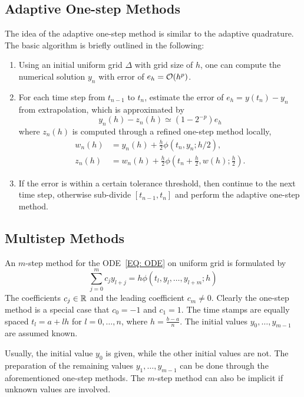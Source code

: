 \subsection{Adaptive One-step Methods}
The idea of the adaptive one-step method is similar to the adaptive quadrature. The basic algorithm is briefly outlined in the following:
\begin{enumerate}
    \item Using an initial uniform grid $\Delta$ with grid size of $h$, one can compute the numerical solution $y_n$ with error of $e_h = \mathcal O(h^p)$.
    \item For each time step from $t_{n-1}$ to $t_n$, estimate the error of $e_h = y(t_n) - y_n$ from extrapolation, which is approximated by 
    $$y_n(h) - z_n(h)\simeq (1 - 2^{-p})e_h$$
    where $z_n(h)$ is computed through a refined one-step method locally,
    \begin{equation}
        \begin{aligned}
            w_n(h) &= y_n(h) + \frac{h}{2} \phi(t_n, y_n; h/2), \\ 
            z_n(h)&=w_n(h) + \frac{h}{2}\phi(t_n+\frac{h}{2}, w(h); \frac{h}{2}).
        \end{aligned}
    \end{equation}
    \item If the error is within a certain tolerance threshold, then continue to the next time step, otherwise sub-divide $[t_{n-1}, t_n]$ and perform the adaptive one-step method.
\end{enumerate}

\subsection{Multistep Methods}
An $m$-step method for the ODE~\eqref{EQ: ODE} on uniform grid is formulated by 
\begin{equation}
    \sum_{j=0}^m c_j y_{l + j} = h \phi(t_l, y_l, \dots, y_{l+m}; h)
\end{equation}
 The coefficients $c_j\in\mathbb R$ and the leading coefficient $c_m\neq 0$. Clearly the one-step method is a special case that $c_0 = -1$ and $c_1 = 1$. The time stamps are equally spaced $t_l = a + l h$ for $l = 0, \dots, n$, where $h = \frac{b-a}{n}$. The initial values $y_0,\dots, y_{m-1}$ are assumed known.

 \begin{remark}
     Usually, the initial value $y_0$ is given, while the other initial values are not. The preparation of the remaining values $y_1,\dots, y_{m-1}$ can be done through the aforementioned one-step methods. The $m$-step method can also be implicit if unknown values are involved.
 \end{remark}

